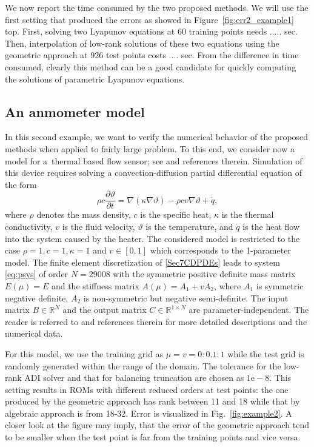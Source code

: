 We now report the time consumed by the two proposed methods. We will use the first setting that produced the errors as showed in Figure~\ref{fig:err2_example1} top. First, solving two Lyapunov equations at 60 training points needs ..... sec. Then, interpolation of low-rank solutions of these two equations using the geometric approach at 926 test points costs .... sec. From the difference in time consumed, clearly this method can be a good candidate for quickly computing the solutions of parametric Lyapunov equations. 



\subsection{An anmometer model}
In this second example, we want to verify the numerical behavior of the proposed methods when applied to fairly large problem. To this end, we consider now a model for a~thermal based flow sensor; see \cite{MoosRGKH05} and references therein. 
Simulation of this device requires solving a convection-diffusion partial differential equation of the form
\begin{equation}\label{Sec7CDPDEs}
\rho c \frac{\partial \vartheta}{\partial t} = \nabla(\kappa \nabla \vartheta)-\rho cv\nabla \vartheta +\dot{q},
\end{equation}
where $\rho$ denotes the mass density, $c$ %
 is the specific heat, $\kappa$
   is the thermal conductivity, 
$v$
 is the fluid velocity, $\vartheta$ is the temperature, and $\dot q$ is the heat flow into the system 
caused by the heater. The considered model is restricted to the case $\rho = 1, c = 1, \kappa = 1$ and $v \in [0,1]$ which corresponds to the 1-parameter model. The finite element discretization of 
\eqref{Sec7CDPDEs} leads to system \eqref{eq:psys} of order $N=29008$ with the symmetric positive definite mass matrix $E(\mu) = E$ 
and the stiffness matrix $A(\mu)=A_1+vA_2$, where 
$A_1$ is symmetric negative definite, $A_2$ is non-symmetric but negative semi-definite.
The input matrix $B\in\mathbb{R}^N$ and the output matrix $C\in\mathbb{R}^{1\times N}$ are parameter-independent.
The reader is referred to \cite{morwiki_anemom} and references therein for more detailed descriptions and the numerical data.

For this model, we use the training grid as $\mu = v = 0:0.1:1$ while the test grid is randomly generated within the range of the domain. The tolerance for the low-rank ADI solver and that for balancing truncation are chosen as $1\mbox{e}-8$. This setting results in ROMs with different reduced orders at test points: the one produced by the geometric approach has rank between 11 and 18 while that by algebraic approach is from 18-32. Error is visualized in Fig.~\ref{fig:example2}. A closer look at the figure may imply, that the error of the geometric approach tend to be smaller when the test point is far from the training points and vice versa. 

